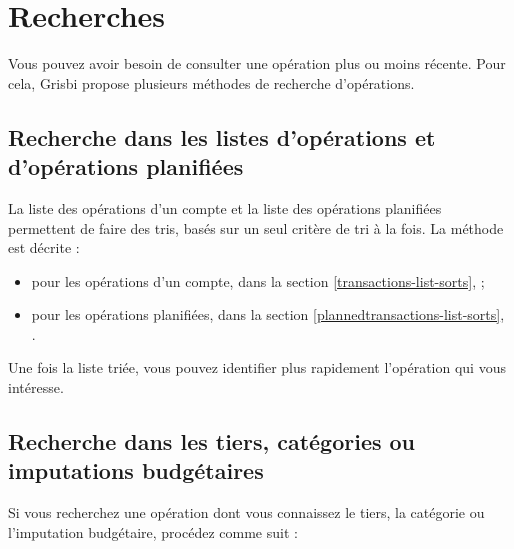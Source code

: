 
\chapter{Recherches\label{search} }

Vous pouvez avoir besoin de consulter une opération plus ou moins récente. Pour cela, Grisbi propose plusieurs méthodes de recherche d'opérations.


\section{Recherche dans les listes d'opérations et d'opérations planifiées\label{search-list} }


La liste des opérations d'un compte et la liste des opérations planifiées permettent de faire des tris, basés sur un seul critère de tri à la fois. La méthode est décrite :

\begin{itemize}
	 \item pour les opérations d'un compte, dans la section \vref{transactions-list-sorts},  ;
	 \item pour les opérations planifiées, dans la section \vref{plannedtransactions-list-sorts}, .
\end{itemize}

Une fois la liste triée, vous pouvez identifier plus rapidement l'opération qui vous intéresse.


\section{Recherche dans les tiers, catégories ou imputations budgétaires\label{search-simple} }


Si vous recherchez une opération dont vous connaissez le tiers, la catégorie ou l'imputation budgétaire, procédez comme suit :

